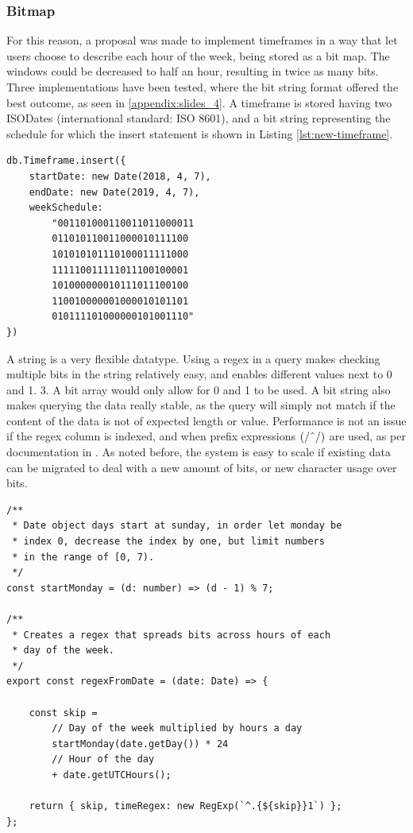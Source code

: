 \subsubsection{Bitmap}
For this reason, a proposal was made to implement timeframes in a way that let users choose to describe each hour of the week, being stored as a bit map. The windows could be decreased to half an hour, resulting in twice as many bits. Three implementations have been tested, where the bit string format offered the best outcome, as seen in \ref{appendix:slides_4}. A timeframe is stored having two ISODates (international standard: ISO 8601), and a bit string representing the schedule for which the insert statement is shown in Listing \ref{lst:new-timeframe}.

\begin{center}
	\noindent\begin{minipage}{.45\textwidth}
		\begin{lstlisting}[caption={Improved timeframe.}, label={lst:new-timeframe}]
db.Timeframe.insert({
	startDate: new Date(2018, 4, 7),
	endDate: new Date(2019, 4, 7),
	weekSchedule:
		"001101000110011011000011
		011010110011000010111100
		101010101110100011111000
		111110011111011100100001
		101000000010111011100100
		110010000001000010101101
		010111101000000101001110"
})
\end{lstlisting}
	\end{minipage}
\end{center}

A string is a very flexible datatype. Using a regex in a query makes checking multiple bits in the string relatively easy, and enables different values next to 0 and 1. 3. A bit array would only allow for 0 and 1 to be used. A bit string also makes querying the data really stable, as the query will simply not match if the content of the data is not of expected length or value. Performance is not an issue if the regex column is indexed, and when prefix expressions $(/\string^/)$ are used, as per documentation in \cite{MongoDB-Regex}. As noted before, the system is easy to scale if existing data can be migrated to deal with a new amount of bits, or new character usage over bits.

\begin{lstlisting}[caption={Opening timeframe.}, label={lst:open-timeframe}]
/**
 * Date object days start at sunday, in order let monday be
 * index 0, decrease the index by one, but limit numbers
 * in the range of [0, 7).
 */
const startMonday = (d: number) => (d - 1) % 7;

/**
 * Creates a regex that spreads bits across hours of each
 * day of the week.
 */
export const regexFromDate = (date: Date) => {

	const skip =
		// Day of the week multiplied by hours a day
		startMonday(date.getDay()) * 24
		// Hour of the day
		+ date.getUTCHours();

	return { skip, timeRegex: new RegExp(`^.{${skip}}1`) };
};
\end{lstlisting}


